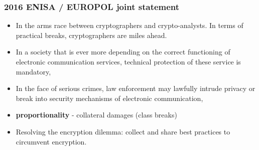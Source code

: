 \documentclass{beamer}
\begin{document}
\begin{frame}
        \frametitle{2016 ENISA / EUROPOL joint statement}
        \begin{itemize}
          \item In the arms race between cryptographers and crypto-analysts. In
            terms of practical breaks, cryptographers are miles ahead.
          \item In a society that is ever more depending on the correct
            functioning of electronic communication services, technical
            protection of these service is mandatory,
          \item In the face of serious crimes, law enforcement may lawfully
            intrude privacy or break into security mechanisms of electronic communication,
          \item {\bf proportionality} - collateral damages (class breaks)
          \item Resolving the encryption dilemma: collect and share best
            practices to circumvent encryption.
        \end{itemize}
\end{frame}
\end{document}
